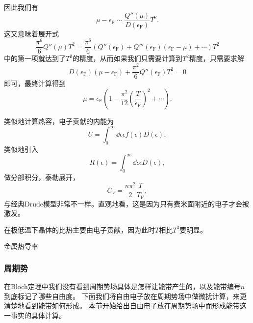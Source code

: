 因此我们有
\[
    \mu - \epsilon_\text{F} \sim \frac{Q''(\mu)}{D(\epsilon_\text{F})} T^2.
\]
这又意味着展开式
\[
    \frac{\pi^6}{6} Q''(\mu) T^2 = \frac{\pi^6}{6} \left( Q''(\epsilon_\text{F}) + Q'''(\epsilon_\text{F}) (\epsilon_\text{F} - \mu) + \cdots \right) T^2
\]
中的第一项就达到了$T^2$的精度，从而如果我们只需要计算到$T^2$精度，只需要求解
\[
    D(\epsilon_\text{F}) (\mu - \epsilon_\text{F}) + \frac{\pi^2}{6} Q''(\epsilon_\text{F}) T^2 = 0
\]
即可，最终计算得到
\begin{equation}
    \mu = \epsilon_\text{F} \left( 1 - \frac{\pi^2}{12} \left( \frac{T}{\epsilon_\text{F}} \right)^2 + \cdots \right).
\end{equation}

类似地计算热容，电子贡献的内能为
\[
    U = \int_0^\infty \dd{\epsilon} \epsilon f(\epsilon) D(\epsilon),
\]
类似地引入
\[
    R(\epsilon) = \int_0^\infty \dd{\epsilon} \epsilon D(\epsilon),
\]
做分部积分，泰勒展开，
\begin{equation}
    C_V = \frac{n \pi^2}{2} \frac{T}{T_\text{F}},
\end{equation}
与经典Drude模型非常不一样。直观地看，这是因为只有费米面附近的电子才会被激发。

在极低温下晶体的比热主要由电子贡献，因为此时$T$相比$T^3$要明显。

金属热导率

\subsubsection{周期势}

在Bloch定理中我们没有看到周期势场具体是怎样让能带产生的，以及能带编号$n$到底标记了哪些自由度。
下面我们将自由电子放在周期势场中做微扰计算，来更清楚地看到能带如何形成。
本节开始给出自由电子放在周期势场中而形成能带这一事实的具体计算。

